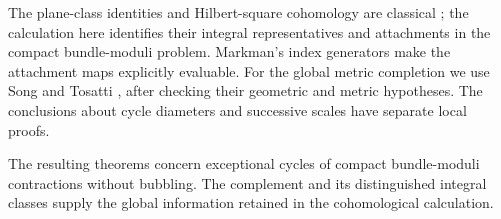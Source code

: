 The plane-class identities and Hilbert-square cohomology are
classical \cite{hassetttschinkel,totaro,gottsche}; the calculation
here identifies their integral representatives and attachments in
the compact bundle-moduli problem. Markman's index generators
\cite{markman} make the attachment maps explicitly evaluable.
For the global metric completion we use Song \cite{song} and
Tosatti \cite{tosatti}, after checking their geometric and
metric hypotheses. The conclusions about cycle diameters and
successive scales have separate local proofs.

The resulting theorems concern exceptional cycles of compact
bundle-moduli contractions without bubbling. The complement and its
distinguished integral classes supply the global information retained
in the cohomological calculation.

